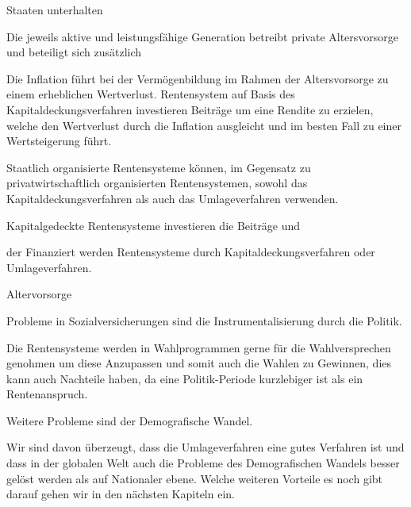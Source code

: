 Staaten unterhalten 

Die jeweils aktive und leistungsfähige Generation betreibt private Altersvorsorge und beteiligt sich zusätzlich 

Die Inflation führt bei der Vermögenbildung im Rahmen der Altersvorsorge zu einem erheblichen Wertverlust. 
Rentensystem auf Basis des Kapitaldeckungsverfahren investieren Beiträge um eine Rendite zu erzielen, welche den Wertverlust durch die Inflation ausgleicht und im besten Fall zu einer Wertsteigerung führt.





Staatlich organisierte Rentensysteme können, im Gegensatz zu privatwirtschaftlich organisierten Rentensystemen, sowohl das Kapitaldeckungsverfahren als auch das Umlageverfahren verwenden. 



Kapitalgedeckte Rentensysteme investieren die Beiträge und 

 der Finanziert werden Rentensysteme durch Kapitaldeckungsverfahren oder Umlageverfahren.



Altervorsorge 

Probleme in Sozialversicherungen sind die Instrumentalisierung durch die Politik.

Die Rentensysteme werden in Wahlprogrammen gerne für die Wahlversprechen genohmen um diese Anzupassen und somit auch die Wahlen zu Gewinnen, dies kann auch Nachteile haben, da eine Politik-Periode kurzlebiger ist als ein Rentenanspruch.

Weitere Probleme sind der Demografische Wandel.


Wir sind davon überzeugt, dass die Umlageverfahren eine gutes Verfahren ist und dass in der globalen Welt auch die Probleme des Demografischen Wandels besser gelöst werden als auf Nationaler ebene. Welche weiteren Vorteile es noch gibt darauf gehen wir in den nächsten Kapiteln ein.


